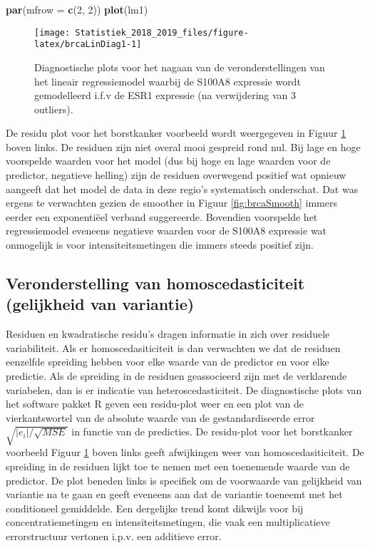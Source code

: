 \documentclass[12pt,dutch,coursenotes]{book}
\newenvironment{Shaded}{\begin{snugshade}}{\end{snugshade}}
\newcommand{\KeywordTok}[1]{\textcolor[rgb]{0.13,0.29,0.53}{\textbf{#1}}}
\newcommand{\DataTypeTok}[1]{\textcolor[rgb]{0.13,0.29,0.53}{#1}}
\newcommand{\DecValTok}[1]{\textcolor[rgb]{0.00,0.00,0.81}{#1}}
\newcommand{\NormalTok}[1]{#1}
\theoremstyle{definition}
\theoremstyle{definition}
\theoremstyle{definition}
\theoremstyle{remark}
\begin{document}
\begin{Shaded}
\begin{Highlighting}[]
\KeywordTok{par}\NormalTok{(}\DataTypeTok{mfrow =} \KeywordTok{c}\NormalTok{(}\DecValTok{2}\NormalTok{, }\DecValTok{2}\NormalTok{))}
\KeywordTok{plot}\NormalTok{(lm1)}
\end{Highlighting}
\end{Shaded}

\begin{figure}

{\centering \texttt{[image: Statistiek\_2018\_2019\_files/figure-latex/brcaLinDiag1-1]} 

}

\caption{Diagnostische plots voor het nagaan van de veronderstellingen van het lineair regressiemodel waarbij de S100A8 expressie wordt gemodelleerd i.f.v de ESR1 expressie (na verwijdering van 3 outliers).}\label{fig:brcaLinDiag1}
\end{figure}

De residu plot voor het borstkanker voorbeeld wordt weergegeven in
Figuur \ref{fig:brcaLinDiag1} boven links. De residuen zijn niet overal
mooi gespreid rond nul. Bij lage en hoge voorspelde waarden voor het
model (dus bij hoge en lage waarden voor de predictor, negatieve
helling) zijn de residuen overwegend positief wat opnieuw aangeeft dat
het model de data in deze regio's systematisch onderschat. Dat was
ergens te verwachten gezien de smoother in Figuur \ref{fig:brcaSmooth}
immers eerder een exponentiëel verband suggereerde. Bovendien voorspelde
het regressiemodel eveneens negatieve waarden voor de S100A8 expressie
wat onmogelijk is voor intensiteitsmetingen die immers steeds positief
zijn.

\subsection{Veronderstelling van homoscedasticiteit (gelijkheid van
variantie)}\label{veronderstelling-van-homoscedasticiteit-gelijkheid-van-variantie}

Residuen en kwadratische residu's dragen informatie in zich over
residuele variabiliteit. Als er homoscedasiticiteit is dan verwachten we
dat de residuen eenzelfde spreiding hebben voor elke waarde van de
predictor en voor elke predictie. Als de spreiding in de residuen
geassocieerd zijn met de verklarende variabelen, dan is er indicatie van
heteroscedasticiteit. De diagnostische plots van het software pakket R
geven een residu-plot weer en een plot van de vierkantswortel van de
absolute waarde van de gestandardiseerde error
\(\sqrt{|e_i|/\sqrt{MSE}}\) in functie van de predicties. De residu-plot
voor het borstkanker voorbeeld Figuur \ref{fig:brcaLinDiag1} boven links
geeft afwijkingen weer van homoscedasiticiteit. De spreiding in de
residuen lijkt toe te nemen met een toenemende waarde van de predictor.
De plot beneden links is specifiek om de voorwaarde van gelijkheid van
variantie na te gaan en geeft eveneens aan dat de variantie toeneemt met
het conditioneel gemiddelde. Een dergelijke trend komt dikwijls voor bij
concentratiemetingen en intensiteitsmetingen, die vaak een
multiplicatieve errorstructuur vertonen i.p.v. een additieve error.
\end{document}
